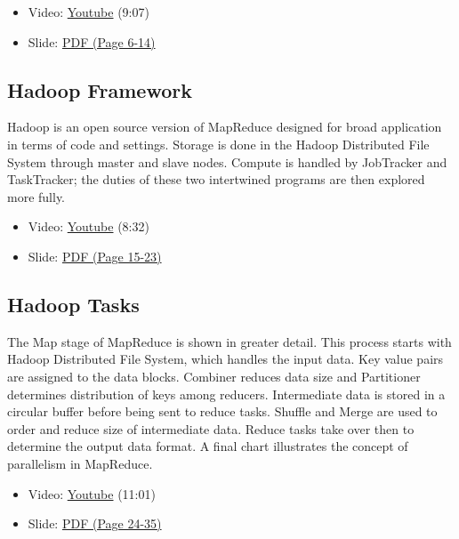 \begin{itemize}

\item
  Video: \href{https://www.youtube.com/watch?v=sSIGaDaulvA}{Youtube}
  (9:07)
\item
  Slide:
  \href{https://drive.google.com/open?id=0B88HKpainTSfMnpCelpNQUpNdVE}{PDF
  (Page 6-14)}
\end{itemize}

\subsection{Hadoop Framework}\label{hadoop-framework}

Hadoop is an open source version of MapReduce designed for broad
application in terms of code and settings. Storage is done in the Hadoop
Distributed File System through master and slave nodes. Compute is
handled by JobTracker and TaskTracker; the duties of these two
intertwined programs are then explored more fully.

\begin{itemize}

\item
  Video: \href{https://www.youtube.com/watch?v=Vuroqly6FTE}{Youtube}
  (8:32)
\item
  Slide:
  \href{https://drive.google.com/open?id=0B88HKpainTSfMnpCelpNQUpNdVE}{PDF
  (Page 15-23)}
\end{itemize}

\subsection{Hadoop Tasks}\label{hadoop-tasks}

The Map stage of MapReduce is shown in greater detail. This process
starts with Hadoop Distributed File System, which handles the input
data. Key value pairs are assigned to the data blocks. Combiner reduces
data size and Partitioner determines distribution of keys among
reducers. Intermediate data is stored in a circular buffer before being
sent to reduce tasks. Shuffle and Merge are used to order and reduce
size of intermediate data. Reduce tasks take over then to determine the
output data format. A final chart illustrates the concept of parallelism
in MapReduce.

\begin{itemize}

\item
  Video: \href{https://www.youtube.com/watch?v=UN4t3tvdjms}{Youtube}
  (11:01)
\item
  Slide:
  \href{https://drive.google.com/open?id=0B88HKpainTSfMnpCelpNQUpNdVE}{PDF
  (Page 24-35)}
\end{itemize}

